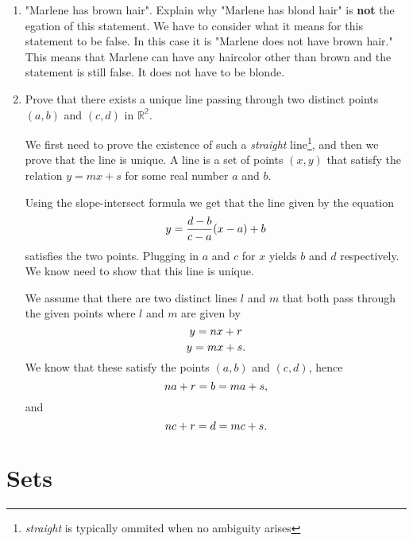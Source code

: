 \documentclass[a4paper, 11pt]{report}
\theoremstyle{plain}
\theoremstyle{definition}
\begin{document}
\begin{enumerate}
    \item "Marlene has brown hair". Explain why "Marlene has blond hair" is
      \textbf{not} the egation of this statement.
      We have to consider what it means for this statement to be false. In this
      case it is "Marlene does not have brown hair." This means that Marlene
      can have any haircolor other than brown and the statement is still false.
      It does not have to be blonde. 

    \item Prove that there exists a unique line passing through two distinct
      points $(a, b)$ and $(c, d)$ in $ \mathbb{R^2}$.
       
      We first need to prove the existence of such a \textit{straight}
      line\footnote{ \textit{straight} is typically ommited when no ambiguity
      arises}, and then we prove that the line is unique. A line is a set of
      points $(x, y)$ that satisfy the relation $y = mx + s$ for some real
      number $a$ and $b$.

      Using the slope-intersect formula we get that the line given by the
      equation
      \begin{equation}
        \notag
        y = \frac{d - b}{c - a}(x - a) + b
      \end{equation}
      satisfies the two points. Plugging in $a$ and $c$ for $x$ yields $b$ and
      $d$ respectively. We know need to show that this line is unique.
    
      We assume that there are two distinct lines $l$ and $m$ that both pass through the given points where $l$ and $m$ are given by
      \begin{equation}
        \notag
        y = nx + r
      \end{equation}
      \begin{equation}
        \notag
        y = mx + s.
      \end{equation}
      We know that these satisfy the points $(a, b)$ and $(c, d)$, hence
      \begin{equation}
        \notag
        na + r = b = ma + s, 
      \end{equation}
      and
      \begin{equation}
        \notag
        nc + r = d = mc + s.
      \end{equation}
\end{enumerate}
\chapter{Sets}
\label{cha:sets}
\printindex
\end{document}
